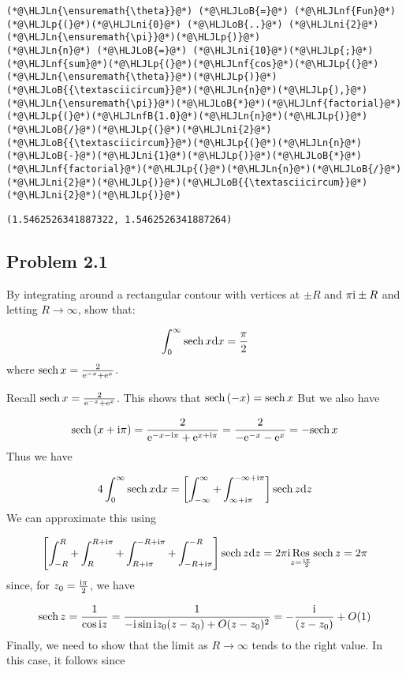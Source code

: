 \documentclass[12pt,a4paper]{article}
\newcommand{\HLJLn}[1]{#1}
\newcommand{\HLJLnf}[1]{\textcolor[RGB]{66,102,213}{#1}}
\newcommand{\HLJLnfB}[1]{\textcolor[RGB]{59,151,46}{#1}}
\newcommand{\HLJLni}[1]{\textcolor[RGB]{59,151,46}{#1}}
\newcommand{\HLJLoB}[1]{\textcolor[RGB]{102,102,102}{\textbf{#1}}}
\newcommand{\HLJLp}[1]{#1}
\def\D{ {\rm d} }
\def\I{ {\rm i} }
\def\E{ {\rm e} }
\def\Res_#1{\underset{#1}{\rm Res}\,}
\def\sech{ {\rm sech}\, }
\def\dx{\D x}
\def\dz{\D z}
\begin{document}
\begin{lstlisting}
(*@\HLJLn{\ensuremath{\theta}}@*) (*@\HLJLoB{=}@*) (*@\HLJLnf{Fun}@*)(*@\HLJLp{(}@*)(*@\HLJLni{0}@*) (*@\HLJLoB{..}@*) (*@\HLJLni{2}@*)(*@\HLJLn{\ensuremath{\pi}}@*)(*@\HLJLp{)}@*)
(*@\HLJLn{n}@*) (*@\HLJLoB{=}@*) (*@\HLJLni{10}@*)(*@\HLJLp{;}@*)
(*@\HLJLnf{sum}@*)(*@\HLJLp{(}@*)(*@\HLJLnf{cos}@*)(*@\HLJLp{(}@*)(*@\HLJLn{\ensuremath{\theta}}@*)(*@\HLJLp{)}@*)(*@\HLJLoB{{\textasciicircum}}@*)(*@\HLJLn{n}@*)(*@\HLJLp{),}@*) (*@\HLJLn{\ensuremath{\pi}}@*)(*@\HLJLoB{*}@*)(*@\HLJLnf{factorial}@*)(*@\HLJLp{(}@*)(*@\HLJLnfB{1.0}@*)(*@\HLJLn{n}@*)(*@\HLJLp{)}@*)(*@\HLJLoB{/}@*)(*@\HLJLp{(}@*)(*@\HLJLni{2}@*)(*@\HLJLoB{{\textasciicircum}}@*)(*@\HLJLp{(}@*)(*@\HLJLn{n}@*)(*@\HLJLoB{-}@*)(*@\HLJLni{1}@*)(*@\HLJLp{)}@*)(*@\HLJLoB{*}@*)(*@\HLJLnf{factorial}@*)(*@\HLJLp{(}@*)(*@\HLJLn{n}@*)(*@\HLJLoB{/}@*)(*@\HLJLni{2}@*)(*@\HLJLp{)}@*)(*@\HLJLoB{{\textasciicircum}}@*)(*@\HLJLni{2}@*)(*@\HLJLp{)}@*)
\end{lstlisting}

\begin{lstlisting}
(1.5462526341887322, 1.5462526341887264)
\end{lstlisting}


\subsection{Problem 2.1}
By integrating around a rectangular contour with vertices at $\pm R$ and $\pi \I \pm R$ and letting $R \rightarrow \infty$, show that:

\[
\int_0^\infty \sech x \dx = {\pi \over 2}
\]
where $\sech x = {2 \over \E^{-x} + \E^x}$.

Recall $\sech x = {2 \over \E^{-x} + \E^x} $. This shows that $\sech(-x) = \sech x$ But we also have

\[
\sech(x + \I \pi) =  {2 \over \E^{-x-\I \pi} + \E^{x+ \I \pi}} =  {2 \over -\E^{-x} - \E^{x}} = -\sech x
\]
Thus we have

\[
    4\int_0^\infty \sech x \dx = \left[ \int_{-\infty}^\infty + \int_{\infty+\I\pi}^{-\infty + \I \pi} \right] \sech z \dz
\]
We can approximate this using

\[
\left[ \int_{-R}^R + \int_R^{R+\I \pi} + \int_{R+\I \pi}^{-R+\I\pi} + \int_{-R+\I \pi}^{-R} \right ] \sech z \dz = 2 \pi \I \Res_{z = {\I \pi \over 2}} \sech z  = 2 \pi
\]
since, for $z_0 = {\I \pi \over 2}$, we have

\[
\sech z = {1 \over \cos \I z} = {1 \over - \I \sin \I z_0 (z- z_0) + O(z-z_0)^2}
= -{\I \over (z- z_0)} + O(1)
\]
Finally, we need to show that the limit as $R \rightarrow \infty$ tends to the right value. In this case, it follows since
\end{document}
